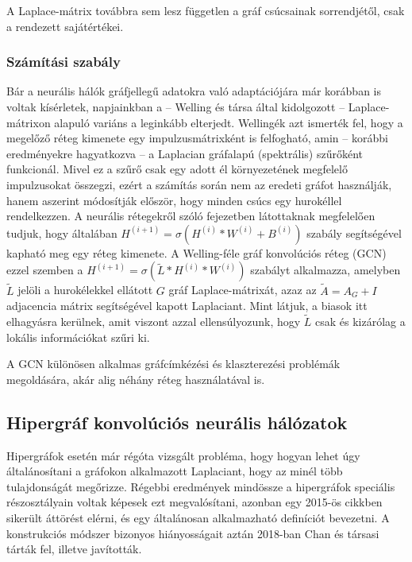 \begin{note}
A Laplace-mátrix továbbra sem lesz független a gráf csúcsainak sorrendjétől, csak a rendezett sajátértékei.
\end{note}

\subsubsection{Számítási szabály} \label{GCNN}
Bár a neurális hálók gráfjellegű adatokra való adaptációjára már korábban is voltak kísérletek\cite{old_gcnn, old_gcnn2}, napjainkban a -- Welling és társa által kidolgozott -- Laplace-mátrixon alapuló variáns\cite{base_gcnn} a leginkább elterjedt. Wellingék azt ismerték fel, hogy a megelőző réteg kimenete egy impulzusmátrixként is felfogható, amin -- korábbi eredményekre hagyatkozva\cite{laplace_filter} -- a Laplacian gráfalapú (spektrális) szűrőként funkcionál. Mivel ez a szűrő csak egy adott él környezetének megfelelő impulzusokat összegzi, ezért a számítás során nem az eredeti gráfot használják, hanem aszerint módosítják először, hogy minden csúcs egy hurokéllel rendelkezzen. A neurális rétegekről szóló fejezetben látottaknak megfelelően tudjuk, hogy általában $H^{(i+1)} = \sigma(H^{(i)} * W^{(i)} + B^{(i)})$ szabály segítségével kapható meg egy réteg kimenete. A Welling-féle gráf konvolúciós réteg (GCN) ezzel szemben a $H^{(i+1)} = \sigma(\tilde L * H^{(i)} * W^{(i)})$ szabályt alkalmazza, amelyben $\tilde L$ jelöli a hurokélekkel ellátott $G$ gráf Laplace-mátrixát, azaz az $\tilde A = A_G + I$ adjacencia mátrix segítségével kapott Laplaciant. Mint látjuk, a biasok itt elhagyásra kerülnek, amit viszont azzal ellensúlyozunk, hogy $\tilde L$ csak és kizárólag a lokális információkat szűri ki.


A GCN különösen alkalmas gráfcímkézési és klaszterezési problémák megoldására, akár alig néhány réteg használatával is.

\subsection{Hipergráf konvolúciós neurális hálózatok} 
Hipergráfok esetén már régóta vizsgált probléma, hogy hogyan lehet úgy általánosítani a gráfokon alkalmazott Laplaciant, hogy az minél több tulajdonságát megőrizze. Régebbi eredmények mindössze a hipergráfok speciális részosztályain voltak képesek ezt megvalósítani\cite{old_spectral_hypergraph, spectra}, azonban egy 2015-ös cikkben\cite{base_hypergraph_laplacian} sikerült áttörést elérni, és egy általánosan alkalmazható definíciót bevezetni. A konstrukciós módszer bizonyos hiányosságait aztán 2018-ban Chan és társasi tárták fel, illetve javították\cite{base_hypergraph_laplacian_refinement}.



